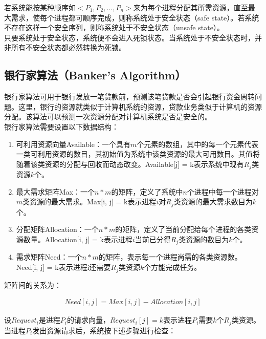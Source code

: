 若系统能按某种顺序如$ <P_1, P_2, \dots, P_n> $来为每个进程分配其所需资源，直至最大需求，使每个进程都可顺序完成，则称系统处于安全状态（safe state）。若系统不存在这样一个安全序列，则称系统处于不安全状态（unsafe state）。\\

只要系统处于安全状态，系统便不会进入死锁状态。当系统处于不安全状态时，并非所有不安全状态都必然转换为死锁。\\

\subsection{银行家算法（Banker's Algorithm）}

银行家算法可用于银行发放一笔贷款前，预测该笔贷款是否会引起银行资金周转问题。这里，银行的资源就类似于计算机系统的资源，贷款业务类似于计算机的资源分配。该算法可以预测一次资源分配对计算机系统是否是安全的。\\

银行家算法需要设置以下数据结构：

\begin{enumerate}
    \item 可利用资源向量Available：一个具有$ m $个元素的数组，其中的每一个元素代表一类可利用资源的数目，其初始值为系统中该类资源的最大可用数目。其值将随着该类资源的分配与回收而动态改变。Available[j] = k表示系统中现有$ R_j $类资源$ k $个。

    \item 最大需求矩阵Max：一个$ n * m $的矩阵，定义了系统中$ n $个进程中每一个进程对$ m $类资源的最大需求。Max[i, j] = k表示进程$ i $对$ R_j $类资源的最大需求数目为$ k $个。

    \item 分配矩阵Allocation：一个$ n * m $的矩阵，定义了当前分配给每个进程的各类资源数量。Allocation[i, j] = k表示进程$ i $当前已分得$ R_j $类资源的数目为$ k $个。

    \item 需求矩阵Need：一个$ n * m $的矩阵，表示每一个进程尚需的各类资源数。Need[i, j] = k表示进程i还需要$ R_j $类资源$ k $个方能完成任务。
\end{enumerate}

矩阵间的关系为：

\vspace{-1cm}
\begin{align}\nonumber
    Need[i, j] = Max[i, j] - Allocation[i, j]
\end{align}

设$ Request_i $是进程$ P_i $的请求向量，$ Request_i[j] = k $表示进程$ P_i $需要$ k $个$ R_j $类资源。当进程$ P_i $发出资源请求后，系统按下述步骤进行检查：

